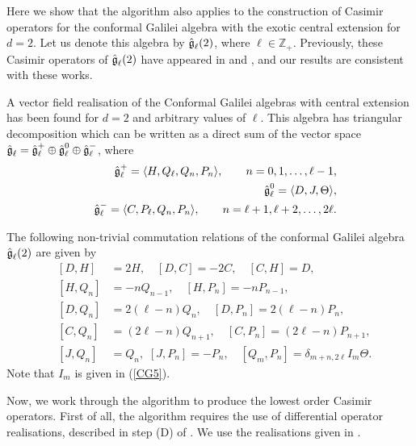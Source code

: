 \documentclass[12pt]{article}
\begin{document}
Here we show that the algorithm also applies to the  construction of Casimir
operators for the conformal Galilei algebra with the exotic central extension
for $d=2$. Let us denote this algebra by $\mathfrak{\Hat{g}}_{\ell}(2)$, where
$\ell \in \mathbb Z_+$. Previously, these Casimir operators of
$\mathfrak{\Hat{g}}_{\ell}(2)$ have appeared in \cite{An12} and \cite{Luk7},
and our results are consistent with these works. 
 
A vector field realisation of the Conformal Galilei algebras with  central
extension has been found for $d=2$ and arbitrary values of  $\ell$\cite{Ai13}.
This algebra has triangular decomposition which can be written as a direct sum
of the vector space $\mathfrak{\Hat{g}}_\ell=\mathfrak{\Hat{g}}^+_{\ell} \oplus
\mathfrak{\Hat{g}}^0_{\ell} \oplus  \mathfrak{\Hat{g}}^-_{\ell} $, where
\begin{eqnarray*}
	&&\mathfrak{\Hat{g}}^+_{\ell}=\langle H,Q_{\ell} ,Q_{n},P_{n} \rangle,
	\qquad n=0,1,\ldots,\ell-1, \\&& \mathfrak{\Hat{g}}^0_{\ell}=\langle D, J,  \Theta \rangle , 
	\\&& \mathfrak{\Hat{g}}^-_{\ell}=\langle C, P_{\ell} ,Q_{n},P_{n}
	\rangle, \qquad   n=\ell+ 1,\ell+2, \ldots,2\ell.  
\end{eqnarray*} 

The following non-trivial commutation relations of the conformal Galilei
algebra $\mathfrak{\Hat{g}}_\ell(2)$ are given by
\begin{eqnarray}
&[D, H]&= 2H,  \quad   [D,C]=-2C ,  \quad [C,H]=D ,\label{g1}
\\&
[H,Q_{n}]&=-nQ_{n-1},          \quad [H,P_{n}]=-nP_{n-1} , \,\label{g2}
\\&
[D,Q_{n}]&=2(\ell-n)Q_{n},    \quad [D,P_{n}]=2(\ell-n)P_{n},\label{g3}                                                                                   
\\& 
[C,Q_{n}]&=(2\ell-n)Q_{n+1},   \quad [C,P_{n}]=(2\ell-n)P_{n+1},\label{g4}
\\&
[J,Q_{n}]&= Q_{n},\,\, [J,P_{n}]=-P_{n},\quad [Q_ {m},P_{n}]= \delta _{m+n,2\ell} I_m \Theta \label{g5}.                                                 
\end{eqnarray}
Note that  $I_m$ is given in   (\ref{CG5}).

Now, we work through the algorithm to produce the
lowest order Casimir operators. First of all, the algorithm
requires the use of differential operator realisations, described in step (D)
of \cite{Als17}. We use the realisations given in \cite{Ai13}.
\end{document}
